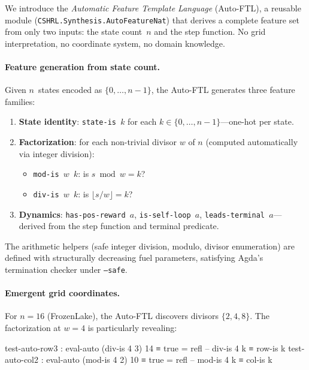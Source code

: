 We introduce the \emph{Automatic Feature Template Language} (Auto-FTL), a reusable module (\texttt{CSHRL.Synthesis.AutoFeatureNat}) that derives a complete feature set from only two inputs: the state count~$n$ and the step function.  No grid interpretation, no coordinate system, no domain knowledge.

\paragraph{Feature generation from state count.}
Given $n$~states encoded as $\{0, \ldots, n{-}1\}$, the Auto-FTL generates three feature families:

\begin{enumerate}
\item \textbf{State identity}: \texttt{state-is~$k$} for each $k \in \{0, \ldots, n{-}1\}$---one-hot per state.
\item \textbf{Factorization}: for each non-trivial divisor $w$ of $n$ (computed automatically via integer division):
  \begin{itemize}
  \item \texttt{mod-is~$w$~$k$}: is $s \bmod w = k$?
  \item \texttt{div-is~$w$~$k$}: is $\lfloor s / w \rfloor = k$?
  \end{itemize}
\item \textbf{Dynamics}: \texttt{has-pos-reward~$a$}, \texttt{is-self-loop~$a$}, \texttt{leads-terminal~$a$}---derived from the step function and terminal predicate.
\end{enumerate}

\noindent The arithmetic helpers (safe integer division, modulo, divisor enumeration) are defined with structurally decreasing fuel parameters, satisfying Agda's termination checker under \texttt{--safe}.

\paragraph{Emergent grid coordinates.}
For $n = 16$ (FrozenLake), the Auto-FTL discovers divisors $\{2, 4, 8\}$.  The factorization at $w = 4$ is particularly revealing:

\begin{spec}
test-auto-row3 : eval-auto (div-is 4 3) 14 ≡ true    = refl   -- div-is 4 k ≡ row-is k
test-auto-col2 : eval-auto (mod-is 4 2) 10 ≡ true     = refl   -- mod-is 4 k ≡ col-is k
\end{spec}

